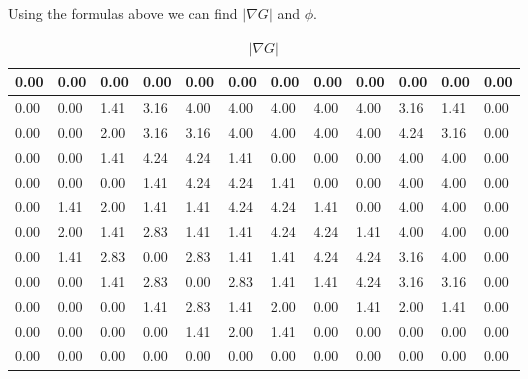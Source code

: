 \documentclass[12pt, letterpaper]{article}
\begin{document}
Using the formulas above we can find $|\nabla G|$ and $\phi$.

\begin{table}[H]
    \centering
    \begin{tabular}{|l|l|l|l|l|l|l|l|l|l|l|l|}
    \hline
        0.00 & 0.00 & 0.00 & 0.00 & 0.00 & 0.00 & 0.00 & 0.00 & 0.00 & 0.00 & 0.00 & 0.00  \\ \hline
        0.00 & 0.00 & 1.41 & 3.16 & 4.00 & 4.00 & 4.00 & 4.00 & 4.00 & 3.16 & 1.41 & 0.00  \\ \hline
        0.00 & 0.00 & 2.00 & 3.16 & 3.16 & 4.00 & 4.00 & 4.00 & 4.00 & 4.24 & 3.16 & 0.00  \\ \hline
        0.00 & 0.00 & 1.41 & 4.24 & 4.24 & 1.41 & 0.00 & 0.00 & 0.00 & 4.00 & 4.00 & 0.00  \\ \hline
        0.00 & 0.00 & 0.00 & 1.41 & 4.24 & 4.24 & 1.41 & 0.00 & 0.00 & 4.00 & 4.00 & 0.00  \\ \hline
        0.00 & 1.41 & 2.00 & 1.41 & 1.41 & 4.24 & 4.24 & 1.41 & 0.00 & 4.00 & 4.00 & 0.00  \\ \hline
        0.00 & 2.00 & 1.41 & 2.83 & 1.41 & 1.41 & 4.24 & 4.24 & 1.41 & 4.00 & 4.00 & 0.00  \\ \hline
        0.00 & 1.41 & 2.83 & 0.00 & 2.83 & 1.41 & 1.41 & 4.24 & 4.24 & 3.16 & 4.00 & 0.00  \\ \hline
        0.00 & 0.00 & 1.41 & 2.83 & 0.00 & 2.83 & 1.41 & 1.41 & 4.24 & 3.16 & 3.16 & 0.00  \\ \hline
        0.00 & 0.00 & 0.00 & 1.41 & 2.83 & 1.41 & 2.00 & 0.00 & 1.41 & 2.00 & 1.41 & 0.00  \\ \hline
        0.00 & 0.00 & 0.00 & 0.00 & 1.41 & 2.00 & 1.41 & 0.00 & 0.00 & 0.00 & 0.00 & 0.00  \\ \hline
        0.00 & 0.00 & 0.00 & 0.00 & 0.00 & 0.00 & 0.00 & 0.00 & 0.00 & 0.00 & 0.00 & 0.00 \\ \hline
    \end{tabular}
    \caption{$|\nabla G|$}
\end{table}
\end{document}
